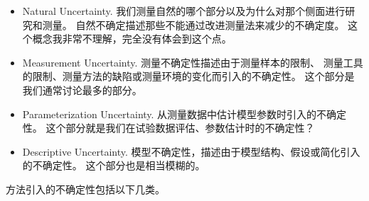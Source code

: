 \documentclass[a4paper]{ctexart}
\begin{document}
\begin{itemize}
      \item[\textbf{自然}] Natural Uncertainty.
            我们测量自然的哪个部分以及为什么对那个侧面进行研究和测量。
            自然不确定描述那些不能通过改进测量法来减少的不确定度。
            这个概念我非常不理解，完全没有体会到这个点。
      \item[\textbf{测量}] Measurement Uncertainty.
            测量不确定性描述由于测量样本的限制、
            测量工具的限制、测量方法的缺陷或测量环境的变化而引入的不确定性。
            这个部分是我们通常讨论最多的部分。
      \item[\textbf{参数}] Parameterization Uncertainty.
            从测量数据中估计模型参数时引入的不确定性。
            这个部分就是我们在试验数据评估、参数估计时的不确定性？
      \item[\textbf{描述}] Descriptive Uncertainty.
            模型不确定性，描述由于模型结构、假设或简化引入的不确定性。
            这个部分也是相当模糊的。
\end{itemize}

方法引入的不确定性包括以下几类。
\end{document}

